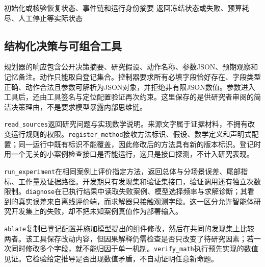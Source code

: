 \begin{algorithm}[H]
  \small
  \DontPrintSemicolon
  \caption{带结构校验、证据记录和冻结边界的科研闭环}
  \label{alg:research-loop}
  初始化或核验恢复状态、事件链和运行身份摘要\;
  返回冻结状态或失败、预算耗尽、人工停止等实际状态\;
\end{algorithm}

\subsection{结构化决策与可组合工具}

规划器的响应包含公开决策摘要、研究假设、动作名称、参数JSON、预期观察和记忆备注。动作只能取自登记集合。控制器要求所有必填字段恰好存在、字段类型正确、动作合法且参数可解析为JSON对象，并拒绝非有限JSON数值。参数进入工具后，还由工具签名与定位配置验证再次约束。这里保存的是供研究者审阅的简洁决策理由，不是要求模型暴露内部思维链。

\texttt{read\_sources}返回研究问题与实现数学说明。来源文字属于证据材料，不拥有改变运行规则的权限。\texttt{register\_method}接收方法标识、假设、数学定义和声明式配置；同一运行中既有标识不能覆盖，因此修改后的方法具有新的版本标识。登记时用一个无关的小案例检查接口是否能运行，这只是接口探测，不计入研究表现。

\texttt{run\_experiment}在相同案例上评价指定方法，返回总体与分场景误差、尾部指标、工作量及证据路径。开发期只有发现集和验证集接口，验证调用还有独立次数限制。\texttt{diagnose}在已执行结果中读取失败案例、模型选择频率与求解诊断；其看到的真实误差来自离线评价端，而求解器只接触观测字段。这一区分允许智能体研究开发集上的失败，却不把未知案例真值作为部署输入。

\texttt{ablate}复制已登记配置并施加模型提出的组件修改，然后在共同的发现集上比较两者。该工具保存改动内容，但因果解释仍需检查是否只改变了待研究因素；若一次同时修改多个字段，就不能归因于单一机制。\texttt{verify\_math}执行预先实现的数值见证。它检验给定推导是否出现数值矛盾，不自动证明任意新命题。

